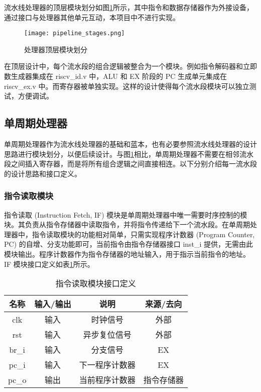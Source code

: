 \documentclass[lang=zh]{sjtuarticle}	%
\begin{document}
流水线处理器的顶层模块划分如图\ref{fig:pipeline_stages}所示\cite{COD}，其中指令和数据存储器作为外接设备，通过接口与处理器其他单元互动，本项目中不进行实现。

\begin{figure}[!htp]
	\centering
	\texttt{[image: pipeline\_stages.png]}
	\caption{处理器顶层模块划分}
	\label{fig:pipeline_stages}
\end{figure}

在顶层设计中，每个流水段的组合逻辑被整合为一个模块。例如指令解码器和立即数生成器集成在 riscv\_id.v 中，ALU 和 EX 阶段的 PC 生成单元集成在 riscv\_ex.v 中。而寄存器被单独实现。这样的设计使得每个流水段模块可以独立测试，方便调试。

\subsection{单周期处理器}

单周期处理器作为流水线处理器的基础和蓝本，也有必要参照流水线处理器的设计思路进行模块划分，以便后续设计。与图\ref{fig:pipeline_stages}相比，单周期处理器不需要在相邻流水段之间插入寄存器，而是将所有组合逻辑之间直接相连。以下分别介绍每一流水段的设计思路和接口定义。

\subsubsection{指令读取模块}

指令读取 (Instruction Fetch, IF) 模块是单周期处理器中唯一需要时序控制的模块。其负责从指令存储器中读取指令，并将指令传递给下一个流水段。在单周期处理器中，指令读取模块的功能相对简单，只需实现程序计数器 (Program Counter, PC) 的自增、分支功能即可，当前指令由指令存储器接口 inst\_i 提供，无需由此模块输出。程序计数器作为指令存储器的地址输入，用于指示当前指令的地址。IF 模块接口定义如表\ref{tab:single_if_io}所示。

\begin{table}[!htp]
	\centering
	\caption{指令读取模块接口定义}
	\label{tab:single_if_io}
	\begin{tabular}{|c|c|c|c|}
		\hline
		名称 & 输入/输出 & 说明 & 来源/去向 \\
		\hline
		clk & 输入 & 时钟信号 & 外部 \\
		\hline
		rst & 输入 & 异步复位信号 & 外部 \\
		\hline
		br\_i & 输入 & 分支信号 & EX \\
		\hline
		pc\_i & 输入 & 下一程序计数器 & EX \\
		\hline
		pc\_o & 输出 & 当前程序计数器 & 指令存储器 \\
		\hline
	\end{tabular}
\end{table}
\end{document}

